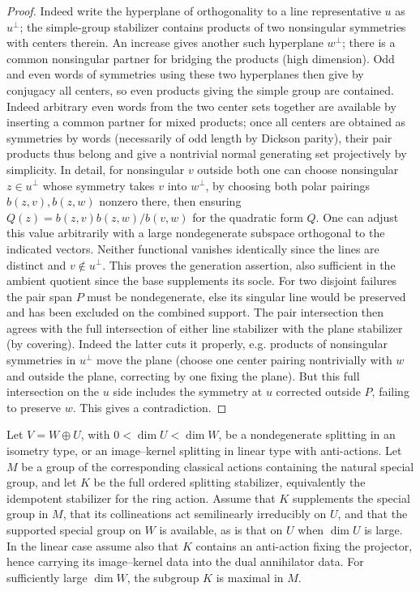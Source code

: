 \begin{proof}

Indeed write the hyperplane of orthogonality to a line representative \(u\) as \(u^\perp\); the
simple-group stabilizer contains products of two nonsingular symmetries with centers therein. An increase
gives another such hyperplane \(w^\perp\); there is a common nonsingular partner for bridging the
products (high dimension). Odd and even words of symmetries using these two hyperplanes then give by
conjugacy all centers, so even products giving the simple group are contained. Indeed arbitrary even
words from the two center sets together are available by inserting a common partner for mixed products;
once all centers are obtained as symmetries by words (necessarily of odd length by Dickson parity), their
pair products thus belong and give a nontrivial normal generating set projectively by simplicity. In
detail, for nonsingular \(v\) outside both one can choose nonsingular \(z\in u^\perp\) whose symmetry
takes \(v\) into \(w^\perp\), by choosing both polar pairings \(b(z,v),b(z,w)\) nonzero there, then
ensuring
\(Q(z)=b(z,v)b(z,w)/b(v,w)\) for the quadratic form \(Q\). One can adjust this value arbitrarily with a
large nondegenerate subspace orthogonal to the indicated vectors. Neither functional vanishes identically
since the lines are distinct and \(v\notin u^\perp\). This proves the generation assertion, also
sufficient in the ambient quotient since the base supplements its socle. For two disjoint failures the
pair span \(P\) must be nondegenerate, else its singular line would be preserved and has been excluded on
the combined support. The pair intersection then agrees with the full intersection of either line
stabilizer with the plane stabilizer (by covering). Indeed the latter cuts it properly, e.g. products of
nonsingular symmetries in \(u^\perp\) move the plane (choose one center pairing nontrivially with \(w\)
and outside the plane, correcting by one fixing the plane). But this full intersection on the \(u\) side
includes the symmetry at \(u\) corrected outside \(P\), failing to preserve \(w\). This gives a
contradiction.

\end{proof}

\begin{proposition}\label{fa:projector-maximal}
Let \(V=W\oplus U\), with \(0<\dim U<\dim W\), be a nondegenerate splitting in an isometry type, or an
image--kernel splitting in linear type with anti-actions.  Let \(M\) be a group of the corresponding
classical actions containing the natural special group, and let \(K\) be the full ordered splitting
stabilizer, equivalently the idempotent stabilizer for the ring action.  Assume that \(K\) supplements
the special group in \(M\), that its collineations act semilinearly irreducibly on \(U\), and that the
supported special group on \(W\) is available, as is that on \(U\) when \(\dim U\) is large.  In the
linear case assume also that \(K\) contains an anti-action fixing the projector, hence carrying its
image--kernel data into the dual annihilator data.  For sufficiently large \(\dim W\), the subgroup \(K\)
is maximal in \(M\).
\end{proposition}

